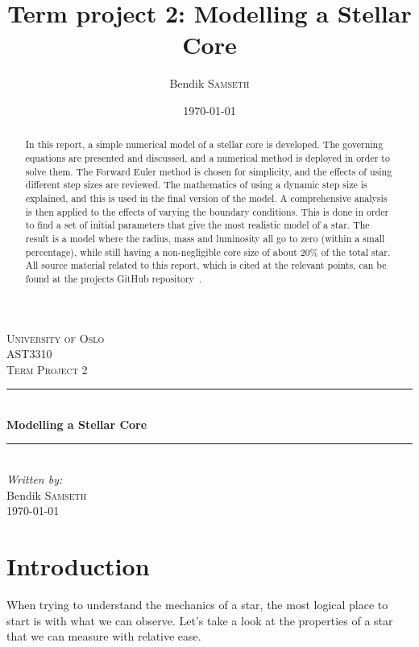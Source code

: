\documentclass[11pt,twocolumn]{article}
\title{Term project 2: Modelling a Stellar Core}
\author{Bendik \textsc{Samseth}}
\date{\today}
\begin{document}
\begin{titlepage}
  \newcommand{\HRule}{\rule{\linewidth}{0.5mm}}
  \center
  \textsc{\LARGE University of Oslo}\\[1.5cm] 
  \textsc{\Large AST3310}\\[0.5cm] 
  \textsc{\large Term Project 2}\\[0.5cm] 
  \HRule \\[0.4cm]
  { \huge \bfseries Modelling a Stellar Core}\\[0.4cm]
  \HRule \\[1.5cm]
  \Large \emph{Written by:}\\
  Bendik \textsc{Samseth}\\[3cm]
  {\large \today}\\[3cm]
  \vfill
\end{titlepage}


\onecolumn
  \tableofcontents
  \begin{abstract}

    In this report, a simple numerical model of a stellar core is
    developed. The governing equations are presented and discussed,
    and a numerical method is deployed in order to solve them. The
    Forward Euler method is chosen for simplicity, and the effects of
    using different step sizes are reviewed. The mathematics of using
    a dynamic step size is explained, and this is used in the final
    version of the model. A comprehensive analysis is then applied to
    the effects of varying the boundary conditions. This is done in
    order to find a set of initial parameters that give the most
    realistic model of a star. The result is a model where the radius,
    mass and luminosity all go to zero (within a small percentage),
    while still having a non-negligible core size of about $20\%$ of
    the total star. All source material related to this report, which
    is cited at the relevant points, can be found at the projects
    GitHub repository~\cite{github}.

  \end{abstract}
\pagebreak
\twocolumn
\section{Introduction}
When trying to understand the mechanics of a star, the most logical
place to start is with what we can observe. Let's take a look at the
properties of a star that we can measure with relative ease. 
\end{document}
